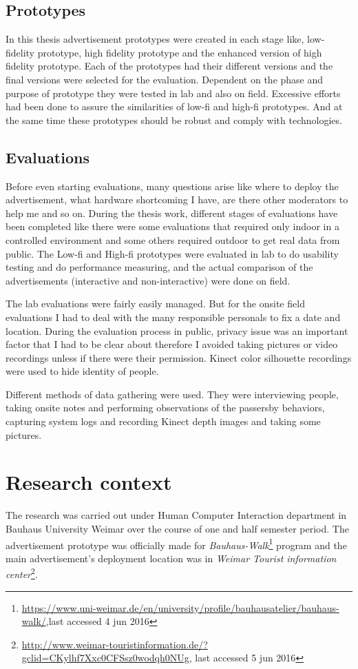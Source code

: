 \subsection{Prototypes}
In this thesis advertisement prototypes were created in each stage like, low-fidelity prototype, high fidelity prototype and the enhanced version of high fidelity prototype. Each of the prototypes had their different versions and the final versions were selected for the evaluation. Dependent on the phase and purpose of prototype they were tested in lab and also on field. Excessive efforts had been done to assure the similarities of low-fi and high-fi prototypes. And at the same time these prototypes should be robust and comply with technologies.  


\subsection{Evaluations}
Before even starting evaluations, many questions arise like where to deploy the advertisement, what hardware shortcoming I have, are there other moderators to help me and so on. During the thesis work, different stages of evaluations have been completed like there were some evaluations that required only indoor in a controlled environment and some others required outdoor to get real data from public. The Low-fi and High-fi prototypes were evaluated in lab to do usability testing and do performance measuring, and the actual comparison of the advertisements (interactive and non-interactive) were done on field. 

The lab evaluations were fairly easily managed. But for the onsite field evaluations I had to deal with the many responsible personals to fix a date and location. During the evaluation process in public, privacy issue was an important factor that I had to be clear about therefore I avoided taking pictures or video recordings unless if there were their permission. Kinect color silhouette recordings were used to hide identity of people.

Different methods of data gathering were used. They were interviewing people, taking onsite notes and performing observations of the passersby behaviors, capturing system logs and recording Kinect depth images and taking some pictures.



\section{Research context}
The research was carried out under Human Computer Interaction department in Bauhaus University Weimar over the course of one and half semester period. The advertisement prototype was officially made for \emph{Bauhaus-Walk}\footnote{\url{ https://www.uni-weimar.de/en/university/profile/bauhausatelier/bauhaus-walk/},last accessed 4 jun 2016} program and the main advertisement's deployment location was in \emph{Weimar Tourist information center}\footnote{\url{ http://www.weimar-touristinformation.de/?gclid=CKylhf7Xxc0CFSsz0wodqh0NUg}, last accessed 5 jun 2016}.


